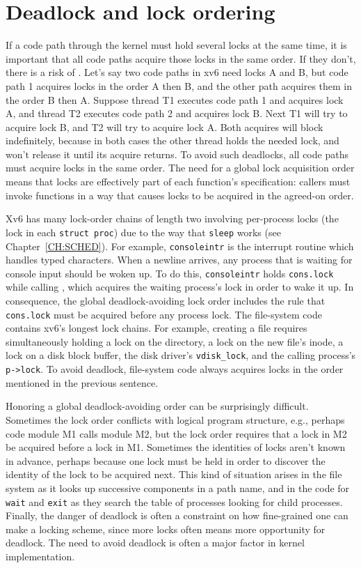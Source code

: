 \section{Deadlock and lock ordering}
If a code path through the kernel must hold several locks at the same time, it is
important that all code paths acquire those locks in the same order.  If
they don't, there is a risk of .  Let's say two code paths in
xv6 need locks A and B, but code path 1 acquires locks in the order A
then B, and the other path acquires them in the order B then A.
Suppose thread T1 executes code path 1 and acquires lock A,
and thread T2 executes code path 2 and acquires lock B.
Next T1 will try to acquire lock B, and T2 will try to acquire lock A.
Both acquires will block indefinitely, because in both cases the
other thread holds the needed lock, and won't release it until
its acquire returns.
To avoid such deadlocks, all code paths must acquire
locks in the same order. The need for a global lock acquisition order
means that locks are effectively part of each function's specification: 
callers must invoke functions in a way that causes locks to be acquired
in the agreed-on order.

Xv6 has many lock-order chains of length two involving
per-process locks
(the lock in each
\lstinline{struct proc})
due to the way that
\lstinline{sleep}
works (see Chapter~\ref{CH:SCHED}).
For example,
\lstinline{consoleintr}
is the interrupt routine which handles typed characters.
When a newline arrives, any process that is waiting for
console input should be woken up.
To do this,
\lstinline{consoleintr}
holds
\lstinline{cons.lock}
while calling 
,
which acquires 
the waiting process's lock in order to wake it up.
In consequence, the global deadlock-avoiding
lock order includes the rule that
\lstinline{cons.lock}
must be acquired before any process lock.
The file-system code contains xv6's longest lock chains.
For example, creating a file requires simultaneously
holding a lock on the directory, a lock on the new file's inode,
a lock on a disk block buffer, 
the disk driver's \lstinline{vdisk_lock},
and
the calling process's \lstinline{p->lock}.
To avoid deadlock, file-system code always acquires locks in the order
mentioned in the previous sentence.

Honoring a global deadlock-avoiding order can be surprisingly
difficult. Sometimes the lock order conflicts with logical program
structure, e.g., perhaps code module M1 calls module M2, but the lock
order requires that a lock in M2 be acquired before a lock in M1.
Sometimes the identities of locks aren't known in advance, perhaps
because one lock must be held in order to discover the identity
of the lock to be acquired next. This kind of situation arises in the
file system as it looks up successive components in a path name, and
in the code for {\tt wait} and {\tt exit} as they search the table of
processes looking for child processes. Finally, the danger of deadlock
is often a constraint on how fine-grained one can make a locking
scheme, since more locks often means more opportunity for deadlock.
The need to avoid deadlock is often a major factor in kernel
implementation.

